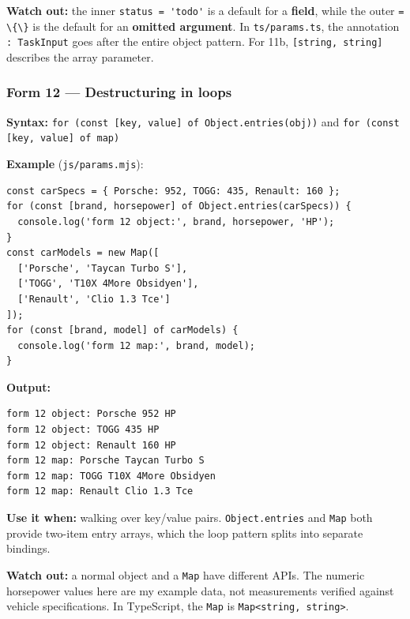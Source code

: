 \documentclass[
  9pt,
]{article}
\newcommand{\passthrough}[1]{#1}
\begin{document}
\textbf{Watch out:} the inner \passthrough{\lstinline!status = 'todo'!}
is a default for a \textbf{field}, while the outer
\passthrough{\lstinline!= \{\}!} is the default for an \textbf{omitted
argument}. In \passthrough{\lstinline!ts/params.ts!}, the annotation
\passthrough{\lstinline!: TaskInput!} goes after the entire object
pattern. For 11b, \passthrough{\lstinline![string, string]!} describes
the array parameter.

\subsubsection{Form 12 --- Destructuring in
loops}\label{form-12-destructuring-in-loops}

\textbf{Syntax:}
\passthrough{\lstinline!for (const [key, value] of Object.entries(obj))!}
and \passthrough{\lstinline!for (const [key, value] of map)!}

\textbf{Example} (\passthrough{\lstinline!js/params.mjs!}):

\begin{lstlisting}
const carSpecs = { Porsche: 952, TOGG: 435, Renault: 160 };
for (const [brand, horsepower] of Object.entries(carSpecs)) {
  console.log('form 12 object:', brand, horsepower, 'HP');
}
const carModels = new Map([
  ['Porsche', 'Taycan Turbo S'],
  ['TOGG', 'T10X 4More Obsidyen'],
  ['Renault', 'Clio 1.3 Tce']
]);
for (const [brand, model] of carModels) {
  console.log('form 12 map:', brand, model);
}
\end{lstlisting}

\textbf{Output:}

\begin{lstlisting}
form 12 object: Porsche 952 HP
form 12 object: TOGG 435 HP
form 12 object: Renault 160 HP
form 12 map: Porsche Taycan Turbo S
form 12 map: TOGG T10X 4More Obsidyen
form 12 map: Renault Clio 1.3 Tce
\end{lstlisting}

\textbf{Use it when:} walking over key/value pairs.
\passthrough{\lstinline!Object.entries!} and
\passthrough{\lstinline!Map!} both provide two-item entry arrays, which
the loop pattern splits into separate bindings.

\textbf{Watch out:} a normal object and a \passthrough{\lstinline!Map!}
have different APIs. The numeric horsepower values here are my example
data, not measurements verified against vehicle specifications. In
TypeScript, the \passthrough{\lstinline!Map!} is
\passthrough{\lstinline!Map<string, string>!}.
\end{document}
